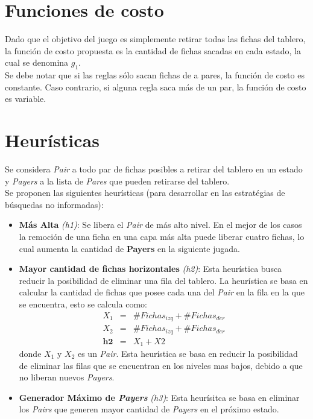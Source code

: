 \documentclass{sig-alternate}
\begin{document}
\section*{Funciones de costo}

	Dado que el objetivo del juego es simplemente retirar todas las fichas del tablero, la funci\'on de costo propuesta es la cantidad de fichas sacadas en cada estado, la cual se denomina \textit{$g_1$}. \\
	Se debe notar que si las reglas s\'olo sacan fichas de a pares, la funci\'on de costo es constante. Caso contrario, si alguna regla saca m\'as de un par, la funci\'on de costo es variable.

\section*{Heur\'isticas}

	Se considera \textit{Pair} a todo par de fichas posibles a retirar del tablero en un estado y \textit{Payers} a la lista de \textit{Pares} que pueden retirarse del tablero. \\
	Se proponen las siguientes heur\'isticas (para desarrollar en las estrat\'egias de b\'usquedas no informadas):
	\begin{itemize}

		\item \textbf{M\'as Alta} \textit{(h1)}: Se libera el \textit{Pair} de m\'as alto nivel. En el mejor de los casos la remoci\'on de una ficha en una capa m\'as alta puede liberar cuatro fichas, lo cual aumenta la cantidad de \textbf{Payers} en la siguiente jugada.
		
		\item \textbf{Mayor cantidad de fichas horizontales} \textit{(h2)}: Esta heur\'istica busca reducir la posibilidad de eliminar una fila del tablero. La heur\'istica se basa en calcular la cantidad de fichas que posee cada una del \textit{Pair} en la fila en la que se encuentra, esto se calcula como:
			\begin{eqnarray}
				X_{1}  & = & \# Fichas_{izq}+ \# Fichas_{der} \\
				X_{2}  & = & \# Fichas_{izq}+ \# Fichas_{der} \\
				\textbf{h2} & = & X_{1} + X{2}
			\end{eqnarray}
		donde $X_{1}$ y $X_{2}$ es un \textit{Pair}. Esta heur\'istica se basa en reducir la posibilidad de eliminar las filas que se encuentran en los niveles mas bajos, debido a que no liberan nuevos \textit{Payers}.
		
		\item \textbf{Generador M\'aximo de \textit{Payers}} \textit{(h3)}: Esta heur\'isitca se basa en eliminar los \textit{Pairs} que generen mayor cantidad de \textit{Payers} en el pr\'oximo estado.
		
	\end{itemize}
\end{document}
